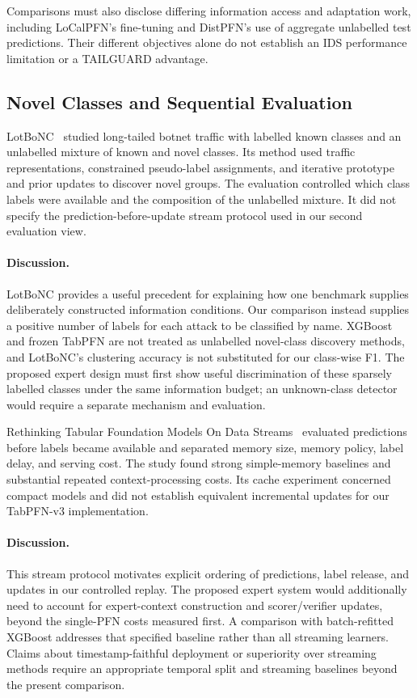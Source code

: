 \documentclass[sigconf,anonymous,pbalance]{acmart}
\begin{document}
Comparisons must also disclose differing information access and adaptation work, including LoCalPFN's fine-tuning and DistPFN's use of aggregate unlabelled test predictions. Their different objectives alone do not establish an IDS performance limitation or a TAILGUARD advantage.

\subsection{Novel Classes and Sequential Evaluation}
LotBoNC~\cite{hu2026lotbonc} studied long-tailed botnet traffic with labelled known classes and an unlabelled mixture of known and novel classes. Its method used traffic representations, constrained pseudo-label assignments, and iterative prototype and prior updates to discover novel groups. The evaluation controlled which class labels were available and the composition of the unlabelled mixture. It did not specify the prediction-before-update stream protocol used in our second evaluation view.

\paragraph{Discussion.}
LotBoNC provides a useful precedent for explaining how one benchmark supplies deliberately constructed information conditions. Our comparison instead supplies a positive number of labels for each attack to be classified by name. XGBoost and frozen TabPFN are not treated as unlabelled novel-class discovery methods, and LotBoNC's clustering accuracy is not substituted for our class-wise F1. The proposed expert design must first show useful discrimination of these sparsely labelled classes under the same information budget; an unknown-class detector would require a separate mechanism and evaluation.

Rethinking Tabular Foundation Models On Data Streams~\cite{verma2026rethinking} evaluated predictions before labels became available and separated memory size, memory policy, label delay, and serving cost. The study found strong simple-memory baselines and substantial repeated context-processing costs. Its cache experiment concerned compact models and did not establish equivalent incremental updates for our TabPFN-v3 implementation.

\paragraph{Discussion.}
This stream protocol motivates explicit ordering of predictions, label release, and updates in our controlled replay. The proposed expert system would additionally need to account for expert-context construction and scorer/verifier updates, beyond the single-PFN costs measured first. A comparison with batch-refitted XGBoost addresses that specified baseline rather than all streaming learners. Claims about timestamp-faithful deployment or superiority over streaming methods require an appropriate temporal split and streaming baselines beyond the present comparison.
\end{document}

